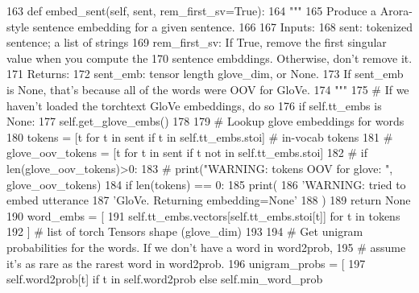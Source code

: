 \begin{DoxyCode}
163     \textcolor{keyword}{def }embed\_sent(self, sent, rem\_first\_sv=True):
164         \textcolor{stringliteral}{"""}
165 \textcolor{stringliteral}{        Produce a Arora-style sentence embedding for a given sentence.}
166 \textcolor{stringliteral}{}
167 \textcolor{stringliteral}{        Inputs:}
168 \textcolor{stringliteral}{          sent: tokenized sentence; a list of strings}
169 \textcolor{stringliteral}{          rem\_first\_sv: If True, remove the first singular value when you compute the}
170 \textcolor{stringliteral}{            sentence embddings. Otherwise, don't remove it.}
171 \textcolor{stringliteral}{        Returns:}
172 \textcolor{stringliteral}{          sent\_emb: tensor length glove\_dim, or None.}
173 \textcolor{stringliteral}{              If sent\_emb is None, that's because all of the words were OOV for GloVe.}
174 \textcolor{stringliteral}{        """}
175         \textcolor{comment}{# If we haven't loaded the torchtext GloVe embeddings, do so}
176         \textcolor{keywordflow}{if} self.tt\_embs \textcolor{keywordflow}{is} \textcolor{keywordtype}{None}:
177             self.get\_glove\_embs()
178 
179         \textcolor{comment}{# Lookup glove embeddings for words}
180         tokens = [t \textcolor{keywordflow}{for} t \textcolor{keywordflow}{in} sent \textcolor{keywordflow}{if} t \textcolor{keywordflow}{in} self.tt\_embs.stoi]  \textcolor{comment}{# in-vocab tokens}
181         \textcolor{comment}{# glove\_oov\_tokens = [t for t in sent if t not in self.tt\_embs.stoi]}
182         \textcolor{comment}{# if len(glove\_oov\_tokens)>0:}
183         \textcolor{comment}{#     print("WARNING: tokens OOV for glove: ", glove\_oov\_tokens)}
184         \textcolor{keywordflow}{if} len(tokens) == 0:
185             print(
186                 \textcolor{stringliteral}{'WARNING: tried to embed utterance %
187                 \textcolor{stringliteral}{'GloVe. Returning embedding=None'} %
188             )
189             \textcolor{keywordflow}{return} \textcolor{keywordtype}{None}
190         word\_embs = [
191             self.tt\_embs.vectors[self.tt\_embs.stoi[t]] \textcolor{keywordflow}{for} t \textcolor{keywordflow}{in} tokens
192         ]  \textcolor{comment}{# list of torch Tensors shape (glove\_dim)}
193 
194         \textcolor{comment}{# Get unigram probabilities for the words. If we don't have a word in word2prob,}
195         \textcolor{comment}{# assume it's as rare as the rarest word in word2prob.}
196         unigram\_probs = [
197             self.word2prob[t] \textcolor{keywordflow}{if} t \textcolor{keywordflow}{in} self.word2prob \textcolor{keywordflow}{else} self.min\_word\_prob
}
\end{DoxyCode}

